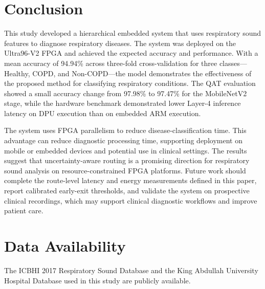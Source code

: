 \section{Conclusion}
\label{sec:conclusion}
This study developed a hierarchical embedded system that uses respiratory sound features to diagnose respiratory diseases. The system was deployed on the Ultra96-V2 FPGA and achieved the expected accuracy and performance. With a mean accuracy of 94.94\% across three-fold cross-validation for three classes—Healthy, COPD, and Non-COPD—the model demonstrates the effectiveness of the proposed method for classifying respiratory conditions. The QAT evaluation showed a small accuracy change from 97.98\% to 97.47\% for the MobileNetV2 stage, while the hardware benchmark demonstrated lower Layer-4 inference latency on DPU execution than on embedded ARM execution.

The system uses FPGA parallelism to reduce disease-classification time. This advantage can reduce diagnostic processing time, supporting deployment on mobile or embedded devices and potential use in clinical settings. The results suggest that uncertainty-aware routing is a promising direction for respiratory sound analysis on resource-constrained FPGA platforms. Future work should complete the route-level latency and energy measurements defined in this paper, report calibrated early-exit thresholds, and validate the system on prospective clinical recordings, which may support clinical diagnostic workflows and improve patient care.

\section*{Data Availability}
The ICBHI 2017 Respiratory Sound Database and the King Abdullah University Hospital Database used in this study are publicly available.

